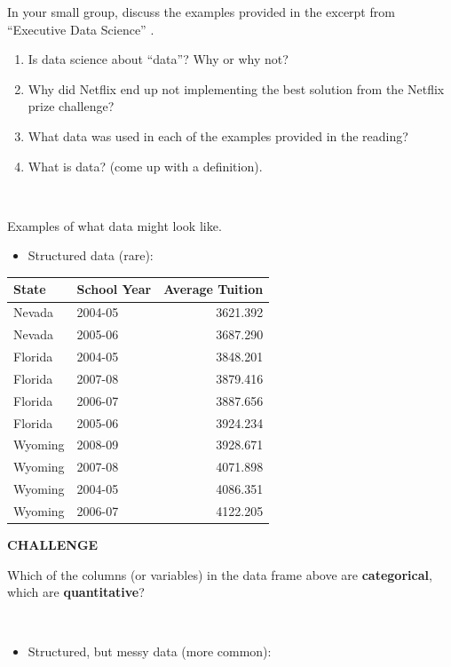 \documentclass[
]{book}
\providecommand{\tightlist}{%
  \setlength{\itemsep}{0pt}\setlength{\parskip}{0pt}}
\begin{document}
In your small group, discuss the examples provided in the excerpt from ``Executive Data Science'' \citep{caffo2016executive}.

\begin{enumerate}
\def\labelenumi{\arabic{enumi})}
\item
  Is data science about ``data''? Why or why not?
\item
  Why did Netflix end up not implementing the best solution from the Netflix prize challenge?
\item
  What data was used in each of the examples provided in the reading?
\item
  What is data? (come up with a definition).
\end{enumerate}

~

Examples of what data might look like.

\begin{itemize}
\tightlist
\item
  Structured data (rare):
\end{itemize}

\begin{tabular}{l|l|r}
\hline
State & School Year & Average Tuition\\
\hline
Nevada & 2004-05 & 3621.392\\
\hline
Nevada & 2005-06 & 3687.290\\
\hline
Florida & 2004-05 & 3848.201\\
\hline
Florida & 2007-08 & 3879.416\\
\hline
Florida & 2006-07 & 3887.656\\
\hline
Florida & 2005-06 & 3924.234\\
\hline
Wyoming & 2008-09 & 3928.671\\
\hline
Wyoming & 2007-08 & 4071.898\\
\hline
Wyoming & 2004-05 & 4086.351\\
\hline
Wyoming & 2006-07 & 4122.205\\
\hline
\end{tabular}

\textbf{CHALLENGE}

Which of the columns (or variables) in the data frame above are \textbf{categorical}, which are \textbf{quantitative}?

~

\begin{itemize}
\tightlist
\item
  Structured, but messy data (more common):
\end{itemize}
\end{document}
